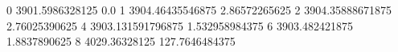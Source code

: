 0 3901.5986328125 0.0
1 3904.46435546875 2.86572265625
2 3904.35888671875 2.76025390625
4 3903.131591796875 1.532958984375
6 3903.482421875 1.8837890625
8 4029.36328125 127.7646484375
